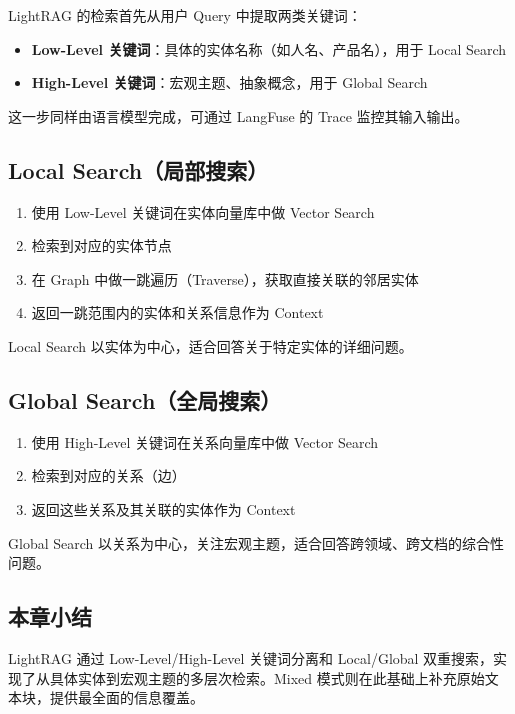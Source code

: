 \documentclass[a4paper]{article}
\begin{document}
LightRAG 的检索首先从用户 Query 中提取两类关键词：

\begin{itemize}
    \item \textbf{Low-Level 关键词}：具体的实体名称（如人名、产品名），用于 Local Search
    \item \textbf{High-Level 关键词}：宏观主题、抽象概念，用于 Global Search
\end{itemize}

这一步同样由语言模型完成，可通过 LangFuse 的 Trace 监控其输入输出。

\subsection{Local Search（局部搜索）}

\begin{enumerate}
    \item 使用 Low-Level 关键词在实体向量库中做 Vector Search
    \item 检索到对应的实体节点
    \item 在 Graph 中做一跳遍历（Traverse），获取直接关联的邻居实体
    \item 返回一跳范围内的实体和关系信息作为 Context
\end{enumerate}

Local Search 以实体为中心，适合回答关于特定实体的详细问题。

\subsection{Global Search（全局搜索）}

\begin{enumerate}
    \item 使用 High-Level 关键词在关系向量库中做 Vector Search
    \item 检索到对应的关系（边）
    \item 返回这些关系及其关联的实体作为 Context
\end{enumerate}

Global Search 以关系为中心，关注宏观主题，适合回答跨领域、跨文档的综合性问题。

\subsection{本章小结}

LightRAG 通过 Low-Level/High-Level 关键词分离和 Local/Global 双重搜索，实现了从具体实体到宏观主题的多层次检索。Mixed 模式则在此基础上补充原始文本块，提供最全面的信息覆盖。
\end{document}
